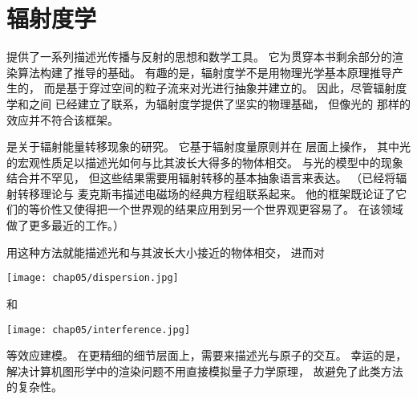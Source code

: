 \section{辐射度学}\label{sec:辐射度学}

提供了一系列描述光传播与反射的思想和数学工具。
它为贯穿本书剩余部分的渲染算法构建了推导的基础。
有趣的是，辐射度学不是用物理光学基本原理推导产生的，
而是基于穿过空间的粒子流来对光进行抽象并建立的。
因此，尽管辐射度学和之间
已经建立了联系，为辐射度学提供了坚实的物理基础，
但像光的
那样的效应并不符合该框架。

是关于辐射能量转移现象的研究。
它基于辐射度量原则并在
层面上操作，
其中光的宏观性质足以描述光如何与比其波长大得多的物体相交。
与光的模型中的现象结合并不罕见，
但这些结果需要用辐射转移的基本抽象语言来表达。
（\citet{PREISENDORFER19653}已经将辐射转移理论与
麦克斯韦描述电磁场的经典方程组联系起来。
他的框架既论证了它们的等价性又使得把一个世界观的结果应用到另一个世界观更容易了。
\citet{Fante:81}在该领域做了更多最近的工作。）

用这种方法就能描述光和与其波长大小接近的物体相交，
进而对
\begin{marginfigure}
    \texttt{[image: chap05/dispersion.jpg]}
\end{marginfigure}
和
\begin{marginfigure}
    \texttt{[image: chap05/interference.jpg]}
\end{marginfigure}
等效应建模。
在更精细的细节层面上，需要来描述光与原子的交互。
幸运的是，解决计算机图形学中的渲染问题不用直接模拟量子力学原理，
故避免了此类方法的复杂性。


